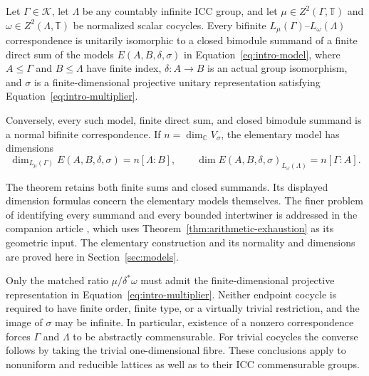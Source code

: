 \begin{theorem}\label{thm:arithmetic-exhaustion}
Let $\Gamma\in\mathscr K$, let $\Lambda$ be any countably infinite ICC
group, and let $\mu\in Z^2(\Gamma,\mathbb T)$ and
$\omega\in Z^2(\Lambda,\mathbb T)$ be normalized scalar cocycles.
Every bifinite $L_\mu(\Gamma)$--$L_\omega(\Lambda)$ correspondence is
unitarily isomorphic to a closed bimodule summand of a finite direct sum
of the models $E(A,B,\delta,\sigma)$ in Equation~\eqref{eq:intro-model},
where $A\leq\Gamma$ and $B\leq\Lambda$ have finite index,
$\delta:A\to B$ is an actual group isomorphism, and $\sigma$ is a
finite-dimensional projective unitary representation satisfying
Equation~\eqref{eq:intro-multiplier}.

Conversely, every such model, finite direct sum, and closed bimodule
summand is a normal bifinite correspondence. If
$n=\dim_{\mathbb C}V_\sigma$, the elementary model has dimensions
\[
 \dim_{L_\mu(\Gamma)}E(A,B,\delta,\sigma)=n[\Lambda:B],\qquad
 \dim E(A,B,\delta,\sigma)_{L_\omega(\Lambda)}=n[\Gamma:A].
\]
\end{theorem}

The theorem retains both finite sums and closed summands. Its displayed
dimension formulas concern the elementary models themselves. The finer
problem of identifying every summand and every bounded intertwiner is
addressed in the companion article \cite{OpenAI2026Category}, which
uses Theorem~\ref{thm:arithmetic-exhaustion} as its geometric input.
The elementary construction and its normality and dimensions are proved
here in Section~\ref{sec:models}.

Only the matched ratio $\mu/\delta^*\omega$ must admit the
finite-dimensional projective representation in
Equation~\eqref{eq:intro-multiplier}. Neither endpoint cocycle is required
to have finite order, finite type, or a virtually trivial restriction,
and the image of $\sigma$ may be infinite. In particular, existence of a
nonzero correspondence forces $\Gamma$ and $\Lambda$ to be abstractly
commensurable. For trivial cocycles the converse follows by taking the
trivial one-dimensional fibre. These conclusions apply to nonuniform
and reducible lattices as well as to their ICC commensurable groups.

